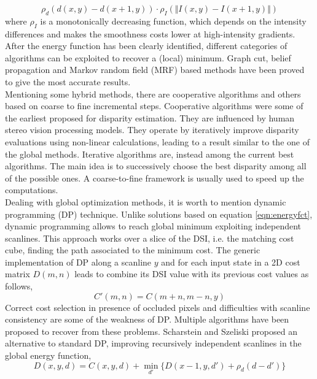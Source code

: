 \begin{equation}\label{smoothtermintensity}
	\rho_d(d(x,y) - d(x + 1, y)) \cdot \rho_I(\Vert I(x,y) - I(x + 1,y) \Vert)
\end{equation}
where $\rho_I$ is a monotonically decreasing function, which depends on the intensity differences and makes the smoothness costs lower at high-intensity gradients.\\
After the energy function has been clearly identified, different categories of algorithms can be exploited to recover a (local) minimum.
Graph cut, belief propagation and Markov random field (MRF) based methods have been proved to give the most accurate results. \\
Mentioning some hybrid methods, there are cooperative algorithms and others based on coarse to fine incremental steps.
Cooperative algorithms were some of the earliest proposed for disparity estimation. They are influenced by human stereo vision processing models. 
They operate by iteratively improve disparity evaluations using non-linear calculations, leading to a result similar to the one of the global methods.
Iterative algorithms are, instead among the current best algorithms.
The main idea is to successively choose the best disparity among all of the possible ones. 
A coarse-to-fine framework is usually used to speed up the computations.\\
Dealing with global optimization methods, it is worth to mention dynamic programming (DP) technique.
Unlike solutions based on equation \ref{eqn:energyfct}, dynamic programming allows to reach global minimum exploiting independent scanlines.
This approach works over a slice of the DSI, i.e. the matching cost cube, finding the path associated to the minimum cost.
The generic implementation of DP along a scanline $y$ and for each input state in a 2D cost matrix $D(m, n)$ leads to combine its DSI value with its previous cost values as follows,
\begin{equation}\label{eqn:dynamicprog}
	C'(m,n) = C(m + n, m - n, y)
\end{equation}
Correct cost selection in presence of occluded pixels and difficulties with scanline consistency are some of the weakness of DP.
Multiple algorithms have been proposed to recover from these problems. 
Scharstein and Szeliski \citep{Scharstein2001} proposed an alternative to standard DP, improving recursively independent scanlines in the global energy function,
\begin{equation}\label{eqn:DPoptimization}
	D(x,y,d) = C(x,y,d) + \min_{d'}\{ D(x - 1, y, d') + \rho_{d} (d - d') \}
\end{equation}
